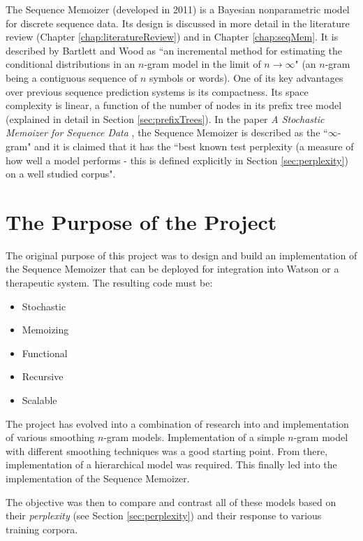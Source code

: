 The Sequence Memoizer (developed in 2011) is a Bayesian nonparametric model for discrete sequence data. Its design is discussed in more detail in the literature review (Chapter \ref{chap:literatureReview}) and in Chapter \ref{chap:seqMem}. It is described by Bartlett and Wood \cite{bartlett2011deplump} as ``an incremental method for estimating the conditional distributions in an $n$-gram model in the limit of $n\to\infty$" (an $n$-gram being a contiguous sequence of $n$ symbols or words). One of its key advantages over previous sequence prediction systems is its compactness. Its space complexity is linear, a function of the number of nodes in its prefix tree model (explained in detail in Section \ref{sec:prefixTrees}). In the paper \textit{A Stochastic Memoizer for Sequence Data} \cite{wood2009stochastic}, the Sequence Memoizer is described as the ``$\infty$-gram" and it is claimed that it has the ``best known test perplexity (a measure of how well a model performs - this is defined explicitly in Section \ref{sec:perplexity}) on a well studied corpus". 




\section{The Purpose of the Project}



The original purpose of this project was to design and build an implementation of the Sequence Memoizer that can be deployed for integration into Watson or a therapeutic system. The resulting code must be:

\begin{itemize}
\item Stochastic
\item Memoizing
\item Functional
\item Recursive
\item Scalable
\end{itemize}

The project has evolved into a combination of research into and implementation of various smoothing $n$-gram models. Implementation of a simple $n$-gram model with different smoothing techniques was a good starting point. From there, implementation of a hierarchical model was required. This finally led into the implementation of the Sequence Memoizer.

The objective was then to compare and contrast all of these models based on their \textit{perplexity} (see Section \ref{sec:perplexity}) and their response to various training corpora. 



